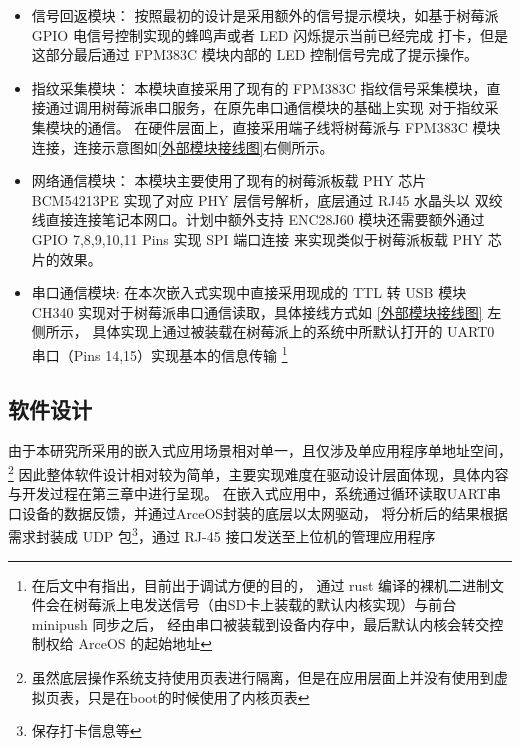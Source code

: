     \begin{itemize}
        \item 信号回返模块：
            按照最初的设计是采用额外的信号提示模块，如基于树莓派 GPIO 电信号控制实现的蜂鸣声或者 LED 闪烁提示当前已经完成
            打卡，但是这部分最后通过 FPM383C 模块内部的 LED 控制信号完成了提示操作。
        \item 指纹采集模块：
            本模块直接采用了现有的 FPM383C 指纹信号采集模块，直接通过调用树莓派串口服务，在原先串口通信模块的基础上实现
            对于指纹采集模块的通信。
            在硬件层面上，直接采用端子线将树莓派与 FPM383C 模块连接，连接示意图如\ref{外部模块接线图}右侧所示\cite{fpm383c-module-specification}。
        \item 网络通信模块：
            本模块主要使用了现有的树莓派板载 PHY 芯片 BCM54213PE 实现了对应 PHY 层信号解析，底层通过 RJ45 水晶头以
            双绞线直接连接笔记本网口。计划中额外支持 ENC28J60 模块还需要额外通过 GPIO 7,8,9,10,11 Pins 实现 SPI 端口连接
            来实现类似于树莓派板载 PHY 芯片的效果。
        \item 串口通信模块:
            在本次嵌入式实现中直接采用现成的 TTL 转 USB 模块 CH340 实现对于树莓派串口通信读取，具体接线方式如 \ref{外部模块接线图} 左侧所示，
            具体实现上通过被装载在树莓派上的系统中所默认打开的 UART0 串口（Pins 14,15）实现基本的信息传输
            \footnote{在后文中有指出，目前出于调试方便的目的，
            通过 rust 编译的裸机二进制文件会在树莓派上电发送信号（由SD卡上装载的默认内核实现）与前台 minipush 同步之后，
            经由串口被装载到设备内存中，最后默认内核会转交控制权给 ArceOS 的起始地址}
    \end{itemize}

\subsection{软件设计}

    由于本研究所采用的嵌入式应用场景相对单一，且仅涉及单应用程序单地址空间，
    \footnote{虽然底层操作系统支持使用页表进行隔离，但是在应用层面上并没有使用到虚拟页表，只是在boot的时候使用了内核页表}
    因此整体软件设计相对较为简单，主要实现难度在驱动设计层面体现，具体内容与开发过程在第三章中进行呈现。
    在嵌入式应用中，系统通过循环读取UART串口设备的数据反馈，并通过ArceOS封装的底层以太网驱动，
    将分析后的结果根据需求封装成 UDP 包\footnote{保存打卡信息等}，通过 RJ-45 接口发送至上位机的管理应用程序

